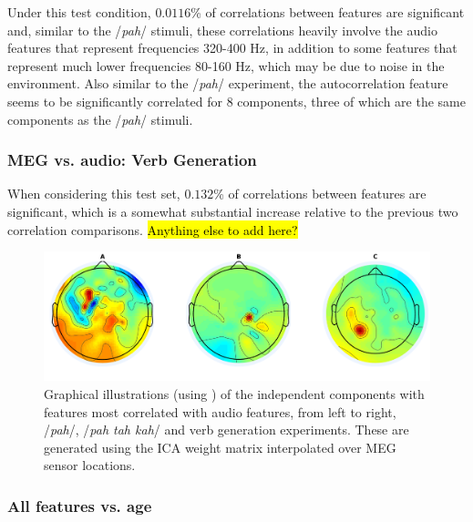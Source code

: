 \documentclass[a4paper]{article}
\newcommand{\FR}[1]{{\small \textcolor{red}{\hl{#1}}}}
\begin{document}
Under this test condition, $0.0116$\% of correlations between features are significant and, similar to the /{\em pah}/ stimuli, these correlations heavily involve the audio features that represent frequencies 320-400 Hz, in addition to some features that represent much lower frequencies 80-160 Hz, which may be due to noise in the environment. Also similar to the /{\em pah}/ experiment, the autocorrelation feature seems to be significantly correlated for 8 components, three of which are the same components as the /{\em pah}/ stimuli.


\subsubsection{MEG vs. audio: Verb Generation}

When considering this test set, $0.132$\% of correlations between features are significant, which is a somewhat substantial increase relative to the previous two correlation comparisons. \FR{Anything else to add here?}

\begin{figure}[t]
  \centering
  \includegraphics[width=\linewidth]{AllComponents.png}
  \caption{Graphical illustrations (using \cite{Delorme04eeglab}) of the independent components with features most correlated with audio features, from left to right, /{\em pah}/, /{\em pah tah kah}/ and verb generation experiments. These are generated using the ICA weight matrix interpolated over MEG sensor locations. }
  \label{fig:components}
\end{figure}

\subsubsection{All features vs. age}
\end{document}
